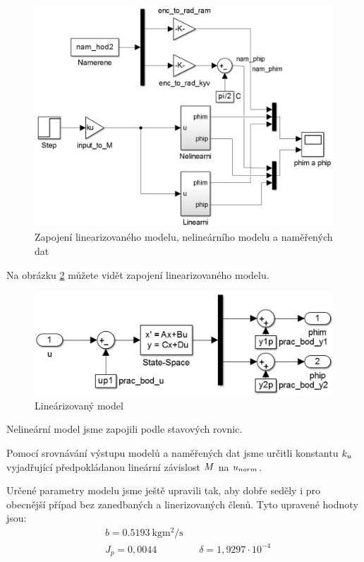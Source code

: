\documentclass[11pt,a4paper]{article}
\begin{document}
\begin{figure}[H]
\includegraphics[width=\textwidth]{schema_celku.jpg}
\caption{Zapojení linearizovaného modelu, nelineárního modelu a naměřených dat}
\label{model:celk}
\end{figure}

Na obrázku \ref{model:lin} můžete vidět zapojení linearizovaného modelu.

\begin{figure}[H]
\centering
\includegraphics[width=\textwidth]{schema_linearizovany.jpg}
\caption{Lineárizovaný model}
\label{model:lin}
\end{figure}

Nelineární model jsme zapojili podle stavových rovnic.
 
Pomocí srovnávání výstupu modelů a naměřených dat jsme určitli konstantu $k_{u}$ vyjadřující předpokládanou lineární závislost $\M$ na $u_{norm}$.
 
Určené parametry modelu jsme ještě upravili tak, aby dobře seděly i pro obecnější případ bez zanedbaných a linerizovaných členů. Tyto upravené hodnoty jsou:
\begin{align*}
&b = \SI{0,5193}{\kilo \gram \meter \squared \per \second} \\
&J_p = 0,0044	&&	\delta = 1,9297\cdot 10^{-4}
\end{align*}
\end{document}
